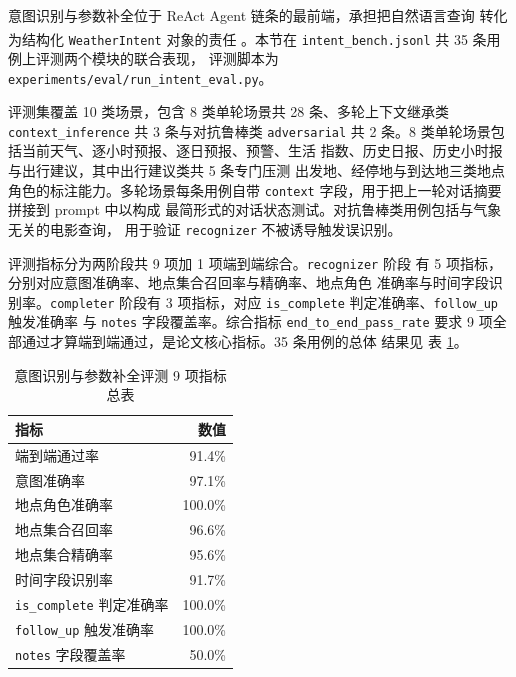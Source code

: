 \documentclass[a4paper]{article}
\newcommand{\song}{\CJKfamily{song}}
\newcommand{\wuhao}{\fontsize{10.5pt}{18pt}\selectfont}
\theoremstyle{definition}
\theoremstyle{plain}
\theoremstyle{remark}
\newcommand{\reftab}[1]{表 \ref{#1}}
\let\oldcite\cite
\renewcommand{\cite}[1]{\textsuperscript{\oldcite{#1}}}
\newcommand{\bk}{\discretionary{}{}{}}
\begin{document}
意图识别与参数补全位于 ReAct Agent 链条的最前端，承担把自然语言查询
转化为结构化 \texttt{WeatherIntent} 对象的责任 \cite{ref18}。本节在
\texttt{intent\_\bk{}bench.\bk{}jsonl} 共 35 条用例上评测两个模块的联合表现，
评测脚本为 \texttt{experiments/\bk{}eval/\bk{}run\_\bk{}intent\_\bk{}eval.\bk{}py}。

评测集覆盖 10 类场景，包含 8 类单轮场景共 28 条、多轮上下文继承类
\texttt{context\_\bk{}inference} 共 3 条与对抗鲁棒类 \texttt{adversarial}
共 2 条。8 类单轮场景包括当前天气、逐小时预报、逐日预报、预警、生活
指数、历史日报、历史小时报与出行建议，其中出行建议类共 5 条专门压测
出发地、经停地与到达地三类地点角色的标注能力。多轮场景每条用例自带
\texttt{context} 字段，用于把上一轮对话摘要拼接到 prompt 中以构成
最简形式的对话状态测试。对抗鲁棒类用例包括与气象无关的电影查询，
用于验证 \texttt{recognizer} 不被诱导触发误识别。

评测指标分为两阶段共 9 项加 1 项端到端综合。\texttt{recognizer} 阶段
有 5 项指标，分别对应意图准确率、地点集合召回率与精确率、地点角色
准确率与时间字段识别率。\texttt{completer} 阶段有 3 项指标，对应
\texttt{is\_\bk{}complete} 判定准确率、\texttt{follow\_\bk{}up} 触发准确率
与 \texttt{notes} 字段覆盖率。综合指标 \texttt{end\_\bk{}to\_\bk{}end\_\bk{}pass\_\bk{}rate}
要求 9 项全部通过才算端到端通过，是论文核心指标。35 条用例的总体
结果见 \reftab{tab:intent-overall}。

\begin{table}[H]
    \centering
    \caption{意图识别与参数补全评测 9 项指标总表}
    \label{tab:intent-overall}
    \song\wuhao
    \begin{tabular}{lr}
        \toprule
        指标 & 数值 \\
        \midrule
        端到端通过率 & 91.4\% \\
        意图准确率 & 97.1\% \\
        地点角色准确率 & 100.0\% \\
        地点集合召回率 & 96.6\% \\
        地点集合精确率 & 95.6\% \\
        时间字段识别率 & 91.7\% \\
        \texttt{is\_\bk{}complete} 判定准确率 & 100.0\% \\
        \texttt{follow\_\bk{}up} 触发准确率 & 100.0\% \\
        \texttt{notes} 字段覆盖率 & 50.0\% \\
        \bottomrule
    \end{tabular}
\end{table}
\end{document}

